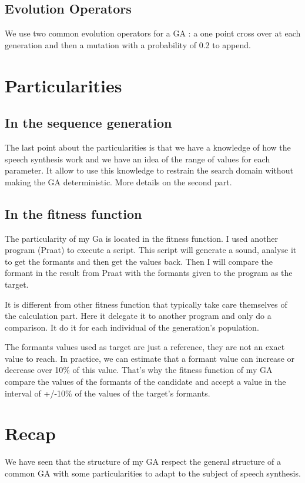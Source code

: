 \documentclass[12pt]{report}
\begin{document}
\subsection{Evolution Operators}
We use two common evolution operators for a GA : a one point cross over at each generation and then a mutation with a probability of 0.2 to append.


\section{Particularities}

\subsection{In the sequence generation}
The last point about the particularities is that we have a knowledge of how the speech synthesis work and we have an idea of the range of values for each parameter. It allow to use this knowledge to restrain the search domain without making the GA deterministic.
More details on the second part.

\subsection{In the fitness function}
The particularity of my Ga is located in the fitness function. I used another program (Praat) to execute a script. This script will generate a sound, analyse it to get the formants and then get the values back. Then I will compare the formant in the result from Praat with the formants given to the program as the target.

It is different from other fitness function that typically take care themselves of the calculation part. Here it delegate it to another program and only do a comparison.
It do it for each individual of the generation's population.

The formants values used as target are just a reference, they are not an exact value to reach. In practice, we can estimate that a formant value can increase or decrease over 10\% of this value. That's why the fitness function of my GA compare the values of the formants of the candidate and accept a value in the interval of +/-10\% of the values of the target's formants.

\section{Recap}
We have seen that the structure of my GA respect the general structure of a common GA with some particularities to adapt to the subject of speech synthesis.
\end{document}
